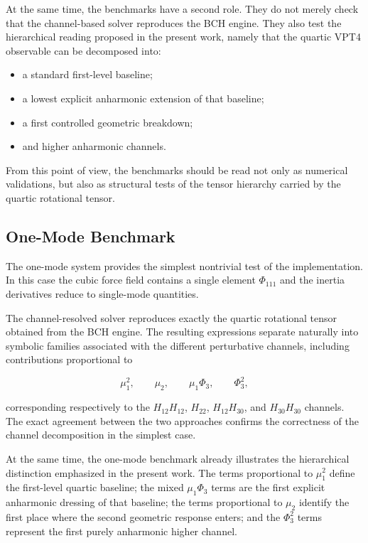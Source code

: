 \documentclass[aip,jcp,reprint]{revtex4-2}
\begin{document}
At the same time, the benchmarks have a second role. They do not merely
check that the channel-based solver reproduces the BCH engine. They also
test the hierarchical reading proposed in the present work, namely that
the quartic VPT4 observable can be decomposed into:

\begin{itemize}
\item a standard first-level baseline;
\item a lowest explicit anharmonic extension of that baseline;
\item a first controlled geometric breakdown;
\item and higher anharmonic channels.
\end{itemize}

From this point of view, the benchmarks should be read not only as
numerical validations, but also as structural tests of the tensor
hierarchy carried by the quartic rotational tensor.

\subsection{One-Mode Benchmark}

The one-mode system provides the simplest nontrivial test of the
implementation.
In this case the cubic force field contains a single element
$\Phi_{111}$ and the inertia derivatives reduce to single-mode
quantities.

The channel-resolved solver reproduces exactly the quartic rotational
tensor obtained from the BCH engine.
The resulting expressions separate naturally into symbolic families
associated with the different perturbative channels,
including contributions proportional to

\begin{equation}
\mu_1^2, \qquad
\mu_2, \qquad
\mu_1 \Phi_3, \qquad
\Phi_3^2 ,
\end{equation}

corresponding respectively to the $H_{12}H_{12}$,
$H_{22}$, $H_{12}H_{30}$, and $H_{30}H_{30}$ channels.
The exact agreement between the two approaches confirms the
correctness of the channel decomposition in the simplest case.

At the same time, the one-mode benchmark already illustrates the
hierarchical distinction emphasized in the present work. The terms
proportional to $\mu_1^2$ define the first-level quartic baseline; the
mixed $\mu_1\Phi_3$ terms are the first explicit anharmonic dressing of
that baseline; the terms proportional to $\mu_2$ identify the first
place where the second geometric response enters; and the $\Phi_3^2$
terms represent the first purely anharmonic higher channel.
\end{document}
